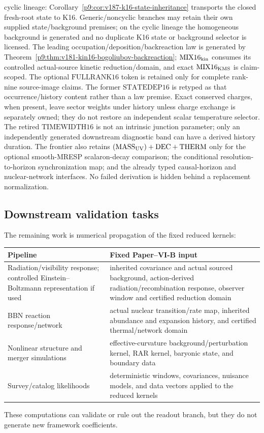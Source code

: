 \documentclass[12pt,a4paper]{article}
\begin{document}
cyclic lineage: Corollary~\ref{p9:cor:v187-k16-state-inheritance} transports the
closed fresh-root state to K16.  Generic/noncyclic branches may retain their
own supplied state/background premises; on the cyclic lineage the homogeneous
background is generated and no duplicate K16 state or background selector is
licensed.  The leading occupation/deposition/backreaction
law is generated by Theorem~\ref{p9:thm:v181-kin16-bogoliubov-backreaction};
\(\mathrm{MIX16}_{\rm kin}\) consumes its controlled actual-source kinetic
reduction/domain, and exact
\(\mathrm{MIX16}_{\rm KMS}\) is claim-scoped.  The optional
\(\mathrm{FULLRANK16}\) token is retained only for complete rank-nine
source-image claims.  The former \(\mathrm{STATEDEP16}\) is retyped as that
occurrence/history content rather than a law premise.  Exact conserved charges,
when present, leave sector weights under history unless charge exchange is
separately owned; they do not restore an independent scalar temperature
selector.  The retired \(\mathrm{TIMEWIDTH16}\) is not an intrinsic junction parameter;
only an independently generated downstream diagnostic band can have a derived
history duration.  The
frontier also retains
\((\mathrm{MASS}_{\rm UV})+\mathrm{DEC}+\mathrm{THERM}\) only for
the optional smooth-MRESP scalaron-decay comparison; the conditional
resolution-to-horizon synchronization map; and the already typed causal-horizon
and nuclear-network interfaces.  No failed derivation is hidden behind a
replacement normalization.


\subsection{Downstream validation tasks}
\label{p9:app:downstream-validation-tasks}
The remaining work is numerical propagation of the fixed reduced kernels:
\begin{center}
\small
\begin{tabularx}{\textwidth}{@{}>{\raggedright\arraybackslash}p{}X@{}}
\toprule
\textbf{Pipeline} & \textbf{Fixed Paper--VI-B input} \\
\midrule
Radiation/visibility response; controlled Einstein--Boltzmann representation if used & inherited covariance and actual sourced background, action-derived radiation/recombination response, observer window and certified reduction domain \\
BBN reaction response/network & actual nuclear transition/rate map, inherited abundance and expansion history, and certified thermal/network domain \\
Nonlinear structure and merger simulations & effective-curvature background/perturbation kernel, RAR kernel, baryonic state, and boundary data \\
Survey/catalog likelihoods & deterministic windows, covariances, nuisance models, and data vectors applied to the reduced kernels \\
\bottomrule
\end{tabularx}
\end{center}
These computations can validate or rule out the readout branch, but they do not
generate new framework coefficients.
\end{document}
